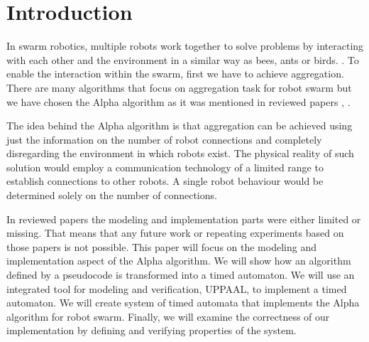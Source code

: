 \section{Introduction}
In swarm robotics, multiple robots work together to solve problems by interacting with each other and the environment in a similar way as bees, ants or birds. \cite{Swarm_Robotic_Behaviors_and_Current_Applications}. To enable the interaction within the swarm, first we have to achieve aggregation. There are many algorithms that focus on aggregation task for robot swarm but we have chosen the Alpha algorithm as it was mentioned in reviewed papers \cite{Towards_Temporal_Verification_of_Emergent_Behaviours_in_Swarm_Robotic_Systems}, \cite{On_Formal_Specification_of_Emergent_Behaviours_in_Swarm_Robotic_Systems}.

The idea behind the Alpha algorithm is that aggregation can be achieved using just the information on the number of robot connections and completely disregarding the environment in which robots exist. The physical reality of such solution would employ a communication technology of a limited range to establish connections to other robots. A single robot behaviour would be determined solely on the number of connections.

In reviewed papers the modeling and implementation parts were either limited or missing. That means that any future work or repeating experiments based on those papers is not possible. This paper will focus on the modeling and implementation aspect of the Alpha algorithm. We will show how an algorithm defined by a pseudocode is transformed into a timed automaton. We will use an integrated tool for modeling and verification, UPPAAL, to implement a timed automaton. We will create system of timed automata that implements the Alpha algorithm for robot swarm. Finally, we will examine the correctness of our implementation by defining and verifying properties of the system.